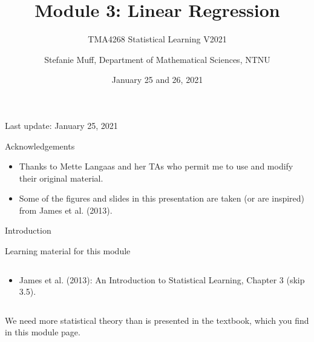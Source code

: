 \documentclass[10pt,ignorenonframetext,]{beamer}
\title{Module 3: Linear Regression}
\subtitle{TMA4268 Statistical Learning V2021}
\author{Stefanie Muff, Department of Mathematical Sciences, NTNU}
\date{January 25 and 26, 2021}
\providecommand{\tightlist}{%
  \setlength{\itemsep}{0pt}\setlength{\parskip}{0pt}}
\begin{document}
\frame{\titlepage}

\begin{frame}

Last update: January 25, 2021

\end{frame}

\begin{frame}{Acknowledgements}
\protect\hypertarget{acknowledgements}{}

\begin{itemize}
\item
  Thanks to Mette Langaas and her TAs who permit me to use and modify
  their original material.
\item
  Some of the figures and slides in this presentation are taken (or are
  inspired) from James et al. (2013).
\end{itemize}

\end{frame}

\begin{frame}{Introduction}
\protect\hypertarget{introduction}{}

\begin{block}{Learning material for this module}

\(~\)

\begin{itemize}
\tightlist
\item
  James et al. (2013): An Introduction to Statistical Learning, Chapter
  3 (skip 3.5).
\end{itemize}

\(~\)

We need more statistical theory than is presented in the textbook, which
you find in this module page.

\end{block}

\end{frame}
\end{document}
